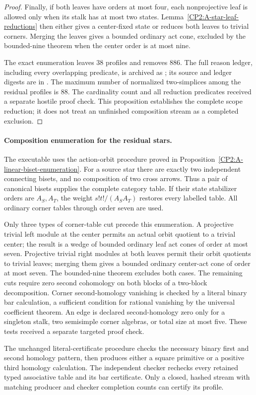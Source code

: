 \begin{proof}
Finally, if both leaves have orders at most four, each
nonprojective leaf is allowed only when its stalk has at
most two states. Lemma~\ref{CP2:A-star-leaf-reductions}
then either gives a center-fixed state or reduces both
leaves to trivial corners. Merging the leaves gives a
bounded ordinary act cone, excluded by the bounded-nine
theorem when the center order is at most nine.

The exact enumeration leaves $38$ profiles and removes
$886$. The full reason ledger, including every overlapping
predicate, is archived as
; its source
and ledger digests are in
.
The maximum number of normalized two-simplices among the
residual profiles is $88$. The cardinality count and all
reduction predicates received a separate hostile proof
check. This proposition establishes the complete scope
reduction; it does not treat an unfinished composition
stream as a completed exclusion.
\end{proof}

\paragraph{Composition enumeration for the residual stars.}
The executable 
uses the action-orbit procedure proved in
Proposition~\ref{CP2:A-linear-biset-enumeration}. For a source
star there are exactly two independent connecting bisets,
and no composition of two cross arrows. Thus a pair of
canonical bisets supplies the complete category table.
If their state stabilizer orders are $A_S,A_T$, the
weight $s!t!/(A_SA_T)$ restores every labelled table.
All ordinary corner tables through order seven are used.

Only three types of corner-table cut precede this
enumeration. A projective trivial left module at the
center permits an actual orbit quotient to a trivial
center; the result is a wedge of bounded ordinary leaf
act cones of order at most seven. Projective trivial
right modules at both leaves permit their orbit quotients
to trivial leaves; merging them gives a bounded ordinary
center-act cone of order at most seven. The bounded-nine
theorem excludes both cases. The remaining cuts require
zero second cohomology on both blocks of a two-block
decomposition. Corner second-homology vanishing is checked
by a literal binary bar calculation, a sufficient condition
for rational vanishing by the universal coefficient theorem.
An edge is declared second-homology zero only for a singleton
stalk, two semisimple corner algebras, or total size at most
five. These tests received a separate targeted proof check.

The unchanged literal-certificate procedure checks the
necessary binary first and second homology pattern, then
produces either a square primitive or a positive third
homology calculation. The independent checker
 rechecks every
retained typed associative table and its bar certificate.
Only a closed, hashed stream with matching producer and
checker completion counts can certify its profile.
